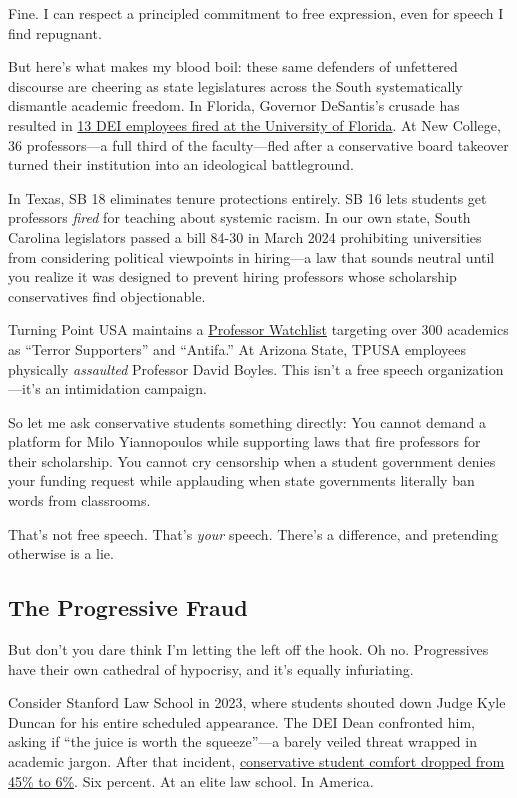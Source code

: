 \documentclass[11pt]{article}
\begin{document}
Fine. I can respect a principled commitment to free expression, even for speech I find repugnant.

But here's what makes my blood boil: these same defenders of unfettered discourse are cheering as state legislatures across the South systematically dismantle academic freedom. In Florida, Governor DeSantis's crusade has resulted in \href{https://www.thefire.org/news/worst-both-worlds-campus-free-speech}{13 DEI employees fired at the University of Florida}. At New College, 36 professors---a full third of the faculty---fled after a conservative board takeover turned their institution into an ideological battleground.

In Texas, SB 18 eliminates tenure protections entirely. SB 16 lets students get professors \textit{fired} for teaching about systemic racism. In our own state, South Carolina legislators passed a bill 84-30 in March 2024 prohibiting universities from considering political viewpoints in hiring---a law that sounds neutral until you realize it was designed to prevent hiring professors whose scholarship conservatives find objectionable.

Turning Point USA maintains a \href{https://www.thefire.org/research-learn/campus-deplatforming-database}{Professor Watchlist} targeting over 300 academics as ``Terror Supporters'' and ``Antifa.'' At Arizona State, TPUSA employees physically \textit{assaulted} Professor David Boyles. This isn't a free speech organization---it's an intimidation campaign.

So let me ask conservative students something directly: You cannot demand a platform for Milo Yiannopoulos while supporting laws that fire professors for their scholarship. You cannot cry censorship when a student government denies your funding request while applauding when state governments literally ban words from classrooms.

That's not free speech. That's \textit{your} speech. There's a difference, and pretending otherwise is a lie.

\subsection{The Progressive Fraud}

But don't you dare think I'm letting the left off the hook. Oh no. Progressives have their own cathedral of hypocrisy, and it's equally infuriating.

Consider Stanford Law School in 2023, where students shouted down Judge Kyle Duncan for his entire scheduled appearance. The DEI Dean confronted him, asking if ``the juice is worth the squeeze''---a barely veiled threat wrapped in academic jargon. After that incident, \href{https://www.thefire.org/news/worst-both-worlds-campus-free-speech}{conservative student comfort dropped from 45\% to 6\%}. Six percent. At an elite law school. In America.
\end{document}
